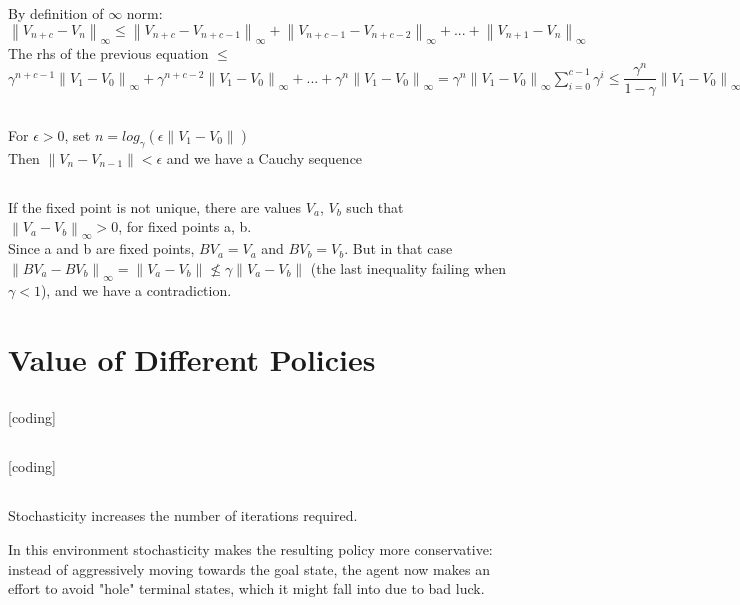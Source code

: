 \documentclass[10pt,a4paper]{article}
\newcommand{\norm}[1]{\left\lVert#1\right\rVert}
\begin{document}
\subsection{}
By definition of $\infty$ norm: \\
$\norm{ V_{n + c} - V_n }_\infty \leq \norm{ V_{n+c} - V_{n+c-1} }_\infty + \norm{ V_{n+c-1} - V_{n+c-2} }_\infty + ... + \norm{ V_{n+1} - V_n }_\infty$ \\
The rhs of the previous equation $\leq$ $\gamma^{n+c-1} \norm{ V_1 - V_0 }_\infty + \gamma^{n+c-2} \norm{ V_1 - V_0 }_\infty + ... + \gamma^n \norm{ V_1 - V_0 }_\infty = \gamma^n \norm{ V_1 - V_0 }_\infty \sum\limits_{i=0}^{c-1}\gamma^i \leq \dfrac{\gamma^n}{1 - \gamma} \norm{ V_1 - V_0}_\infty$

\subsection{}
For $\epsilon > 0$, set $n = log_\gamma(\epsilon \norm{ V_1 - V_0 } )$ \\
Then $\norm{ V_n - V_{n-1} } < \epsilon$ and we have a Cauchy sequence

\subsection{}
If the fixed point is not unique, there are values $V_a$, $V_b$ such that $\norm{ V_a - V_b }_\infty > 0$, for fixed points a, b. \\

Since a and b are fixed points, $BV_a = V_a$ and $BV_b = V_b$.  But in that case $\norm{BV_a - BV_b }_\infty = \norm{ V_a - V_b } \nleq \gamma\norm{ V_a - V_b }$ (the last inequality failing when $\gamma < 1$), and we have a contradiction.

  \section{Value of Different Policies}
\subsection{} [coding]
\subsection{} [coding]
\subsection{}
  Stochasticity increases the number of iterations required. \par

  In this environment stochasticity makes the resulting policy more conservative: instead of aggressively moving towards the goal state, the agent now makes an effort to avoid "hole" terminal states, which it might fall into due to bad luck.
  
\end{document}
